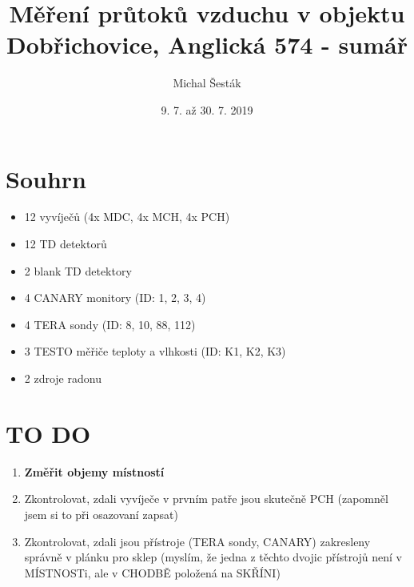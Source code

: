 \documentclass[11pt,a4paper]{article}
\author{Michal Šesták}
\date{9. 7. až 30. 7. 2019}
\title{Měření průtoků vzduchu v objektu Dobřichovice, Anglická 574 - sumář}
\begin{document}
\maketitle
\section*{Souhrn}
\begin{itemize}
	\item 12 vyvíječů (4x MDC, 4x MCH, 4x PCH)
	\item 12 TD detektorů
	\item 2 blank TD detektory 
	\item 4 CANARY monitory (ID: 1, 2, 3, 4)
	\item 4 TERA sondy (ID: 8, 10, 88, 112)
	\item 3 TESTO měřiče teploty a vlhkosti (ID: K1, K2, K3)
	\item 2 zdroje radonu
\end{itemize}
\section*{TO DO}
\begin{enumerate}
	\item \textbf{Změřit objemy místností}
	\item Zkontrolovat, zdali vyvíječe v prvním patře jsou skutečně PCH (zapomněl jsem si to při osazovaní zapsat)
	\item Zkontrolovat, zdali jsou přístroje (TERA sondy, CANARY) zakresleny správně v plánku pro sklep (myslím, že jedna z těchto dvojic přístrojů není v MÍSTNOSTi, ale v CHODBĚ položená na SKŘÍNI)
\end{enumerate}
\end{document}
